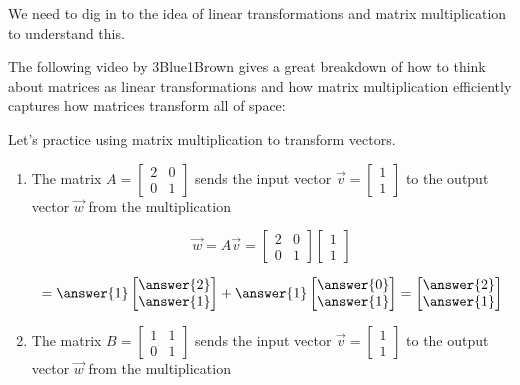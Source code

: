 \documentclass{ximera}
\begin{document}
We need to dig in to the idea of linear transformations and matrix multiplication to understand this.

The following video by 3Blue1Brown gives a great breakdown of how to think about matrices as linear transformations and how matrix multiplication efficiently captures how matrices transform all of space:




\begin{problem}
  Let's practice using matrix multiplication to transform vectors.
  \begin{enumerate}
    \item The matrix $A = \begin{bmatrix}2 & 0 \\ 0 & 1\end{bmatrix}$ sends the input vector $\vec{v} = \begin{bmatrix}1 \\ 1\end{bmatrix}$ to the output vector $\vec{w}$ from the multiplication
    
    $$\vec{w} = A\vec{v}= \begin{bmatrix}2 & 0 \\ 0 & 1\end{bmatrix}\begin{bmatrix}1 \\ 1\end{bmatrix}$$

    $$=\answer{1}\begin{bmatrix}
      \answer{2} \\ \answer{1}
    \end{bmatrix} + \answer{1}\begin{bmatrix}
      \answer{0} \\ \answer{1}
    \end{bmatrix} = \begin{bmatrix}
      \answer{2} \\ \answer{1}
    \end{bmatrix}$$

  \item The matrix $B = \begin{bmatrix}1 & 1 \\ 0 & 1\end{bmatrix}$ sends the input vector $\vec{v} = \begin{bmatrix}1 \\ 1\end{bmatrix}$ to the output vector $\vec{w}$ from the multiplication


\end{enumerate}
\end{problem}
\end{document}
